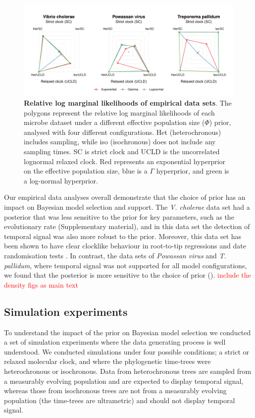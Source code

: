 \documentclass[10pt,letterpaper]{article}
\begin{document}
\begin{figure}
	\begin{center}
		\includegraphics[width=14cm]{sandbox_figures/polygon_plot.pdf}\newline
		\vspace{-0.5cm}
		\caption{\textbf{Relative log marginal likelihoods of empirical data sets}. The polygons represent the relative log marginal likelihoods of each microbe dataset under a different effective population size ($\Phi$) prior, analysed with four different configurations. Het (heterochronous) includes sampling, while iso (isochronous) does not include any sampling times. SC is strict clock and UCLD is the uncorrelated lognormal relaxed clock. Red represents an exponential hyperprior on the effective population size, blue is a $\Gamma$ hyperprior, and green is a log-normal hyperprior.}
		\label{figure:polygon_plots}
	\end{center}
\end{figure}

Our empirical data analyses overall demonstrate that the choice of prior has an impact on Bayesian model selection and support. The \textit{V. cholerae} data set had a posterior that was less sensitive to the prior for key parameters, such as the evolutionary rate (Supplementary material), and in this data set the detection of temporal signal was also more robust to the prior. Moreover, this data set has been shown to have clear clocklike behaviour in root-to-tip regressions and date randomisation tests \cite{duchene2016genome}. In contrast, the data sets of \textit{Powassan virus} and \textit{T. pallidum}, where temporal signal was not supported for all model configurations, we found that the posterior is more sensitive to the choice of prior (). \textcolor{red}{include the density figs as main text}

\subsection*{Simulation experiments}
To understand the impact of the prior on Bayesian model selection we conducted a set of simulation experiments where the data generating process is well understood. We conducted simulations under four possible conditions; a strict or relaxed molecular clock, and where the phylogenetic time-trees were heterochronous or isochronous. Data from heterochronous trees are sampled from a measurably evolving population and are expected to display temporal signal, whereas those from isochronous trees are not from a measurably evolving population (the time-trees are ultrametric) and should not display temporal signal. 
\end{document}
